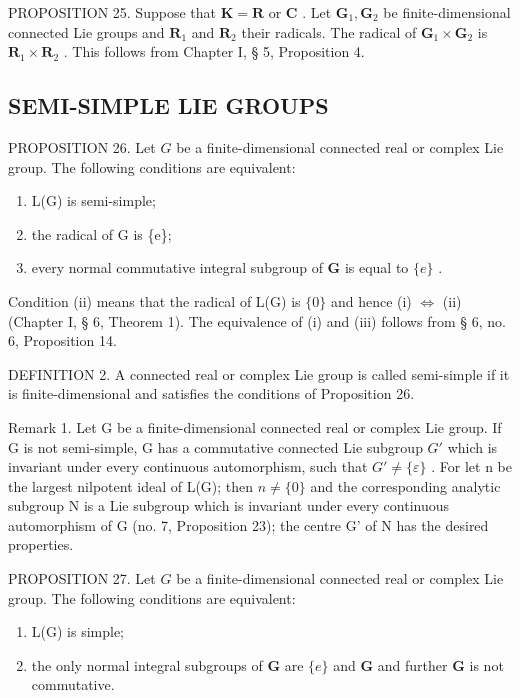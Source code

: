 PROPOSITION 25. Suppose that \(\mathbf{K} = \mathbf{R}\) or \(\mathbf{C}\) . Let \(\mathbf{G}_1, \mathbf{G}_2\) be finite-dimensional connected Lie groups and \(\mathbf{R}_1\) and \(\mathbf{R}_2\) their radicals. The radical of \(\mathbf{G}_1 \times \mathbf{G}_2\) is \(\mathbf{R}_1 \times \mathbf{R}_2\) . This follows from Chapter I, § 5, Proposition 4.

\subsection{SEMI-SIMPLE LIE GROUPS}

PROPOSITION 26. Let \(G\) be a finite-dimensional connected real or complex Lie group. The following conditions are equivalent:

\begin{enumerate}
\def\labelenumi{(\roman{enumi})}
\item
  L(G) is semi-simple;
\item
  the radical of G is \{e\};
\item
  every normal commutative integral subgroup of \(\mathbf{G}\) is equal to \(\{e\}\) .
\end{enumerate}

Condition (ii) means that the radical of L(G) is \(\{0\}\) and hence (i) \(\Leftrightarrow\) (ii) (Chapter I, § 6, Theorem 1). The equivalence of (i) and (iii) follows from § 6, no. 6, Proposition 14.

DEFINITION 2. A connected real or complex Lie group is called semi-simple if it is finite-dimensional and satisfies the conditions of Proposition 26.

Remark 1. Let G be a finite-dimensional connected real or complex Lie group. If G is not semi-simple, G has a commutative connected Lie subgroup \(G'\) which is invariant under every continuous automorphism, such that \(G' \neq \{\varepsilon\}\) . For let n be the largest nilpotent ideal of L(G); then \(n \neq \{0\}\) and the corresponding analytic subgroup N is a Lie subgroup which is invariant under every continuous automorphism of G (no. 7, Proposition 23); the centre G' of N has the desired properties.

PROPOSITION 27. Let \(G\) be a finite-dimensional connected real or complex Lie group. The following conditions are equivalent:

\begin{enumerate}
\def\labelenumi{(\roman{enumi})}
\item
  L(G) is simple;
\item
  the only normal integral subgroups of \(\mathbf{G}\) are \(\{e\}\) and \(\mathbf{G}\) and further \(\mathbf{G}\) is not commutative.
\end{enumerate}

